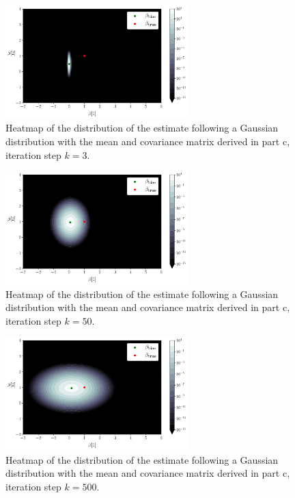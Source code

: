 \documentclass[12pt,twoside]{article}
\begin{document}
\begin{enumerate}
\begin{enumerate}
	\begin{figure}[H]
		\centering
		\captionsetup{justification=centering}
		\includegraphics[width=200pt]{code/Q1/RR_GD_scatterplot_distribution0.pdf}
		\caption{Heatmap of the distribution of the estimate following a Gaussian distribution with the mean and covariance matrix derived in part c, iteration step $k=3$.}
	\end{figure}

 
 
	\begin{figure}[H]
		\centering
		\captionsetup{justification=centering}
		\includegraphics[width=200pt]{code/Q1/RR_GD_scatterplot_distribution1.pdf}
		\caption{Heatmap of the distribution of the estimate following a Gaussian distribution with the mean and covariance matrix derived in part c, iteration step $k=50$.}
	\end{figure}

	\begin{figure}[H]
		\centering
		\captionsetup{justification=centering}
		\includegraphics[width=200pt]{code/Q1/RR_GD_scatterplot_distribution2.pdf}
		\caption{Heatmap of the distribution of the estimate following a Gaussian distribution with the mean and covariance matrix derived in part c, iteration step $k=500$.}
	\end{figure}


\end{enumerate}
\end{enumerate}
\end{document}
